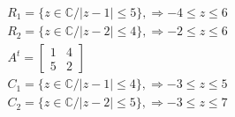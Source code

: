 \documentclass[11pt]{beamer}
\begin{document}
    \begin{frame}
    \begin{eqnarray}
      R_1 = \{ z \in \mathbb{C} / |z-1|\leq 5\}, \Rightarrow -4 \leq z \leq 6\nonumber\\
      R_2 = \{ z \in \mathbb{C} / |z-2|\leq 4\}, \Rightarrow -2 \leq z \leq 6\nonumber
    \end{eqnarray}
    \begin{eqnarray}
       & A^t = \left[\begin{array}{cc}
                                1 & 4 \\
                                5 & 2
                             \end{array}\right] &\nonumber\\
      &C_1 = \{ z \in \mathbb{C} / |z-1|\leq 4\}, \Rightarrow -3 \leq z \leq 5&\nonumber\\
      &C_2 = \{ z \in \mathbb{C} / |z-2|\leq 5\}, \Rightarrow -3 \leq z \leq 7&\nonumber
    \end{eqnarray}
    \end{frame}
  
\end{document}
